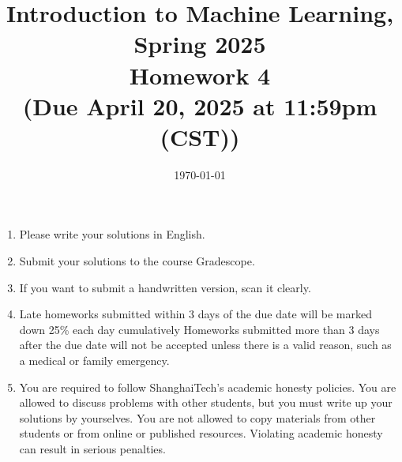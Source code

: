 \documentclass[10pt]{article}
\begin{document}
\date{\today}
\title{Introduction to Machine Learning, Spring 2025 \\
	Homework 4 \\
	\small (Due April 20, 2025 at 11:59pm (CST))}
\maketitle

\begin{enumerate}
	\item Please write your solutions in English.
	\item Submit your solutions to the course Gradescope.
	\item If you want to submit a handwritten version, scan it clearly.
	\item Late homeworks submitted within 3 days of the due date will be marked down 25\% each day cumulatively Homeworks submitted more than 3 days after the due date will not be accepted unless there is a valid reason, such as a medical or family emergency.
	\item You are required to follow ShanghaiTech's academic honesty policies.  You are allowed to discuss problems with other students, but you must write up your solutions by yourselves.  You are not allowed to copy materials from other students or from online or published resources.  Violating academic honesty can result in serious penalties.
	\end{enumerate}
\newpage


\begin{enumerate}





\end{enumerate}
\end{document}
